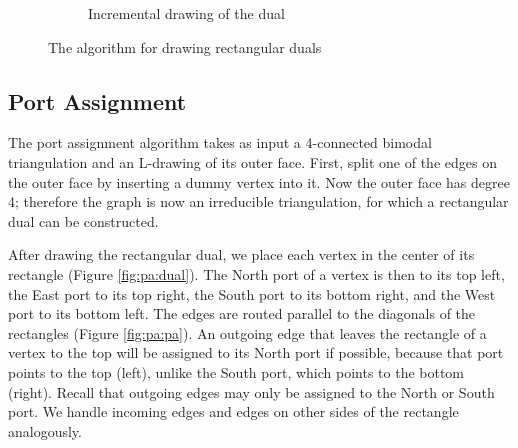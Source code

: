 \documentclass[a4paper]{article}
\begin{document}
\begin{figure}[ht]
\begin{subfigure}{0.59\textwidth}
\begin{tikzpicture}[scale=0.5]
        \end{tikzpicture}
        \quad
        \caption{Incremental drawing of the dual}
        \label{fig:dual:dual}
    \end{subfigure}
    \caption{The algorithm for drawing rectangular duals}
    \label{fig:dual}
\end{figure}

\subsection{Port Assignment}
The port assignment algorithm \cite{ldrawing} takes as input a 4-connected
bimodal triangulation and an L-drawing of its outer face.
First, split one of the edges on the outer face by inserting a dummy vertex into
it.
Now the outer face has degree 4; therefore the graph is now an irreducible
triangulation, for which a rectangular dual can be constructed.

After drawing the rectangular dual, we place each vertex in the center of its
rectangle (Figure \ref{fig:pa:dual}).
The North port of a vertex is then to its top left, the East port to its top
right, the South port to its bottom right, and the West port to its bottom left.
The edges are routed parallel to the diagonals of the rectangles (Figure
\ref{fig:pa:pa}).
An outgoing edge that leaves the rectangle of a vertex to the top will be
assigned to its North port if possible, because that port points to the top
(left), unlike the South port, which points to the bottom (right).
Recall that outgoing edges may only be assigned to the North or South port.
We handle incoming edges and edges on other sides of the rectangle
analogously.
\end{document}
